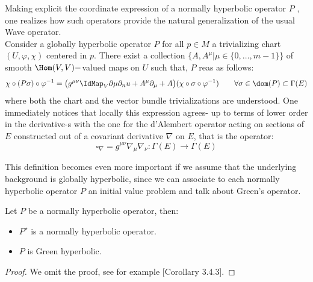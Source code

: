 \documentclass[Main]{subfiles}
\begin{document}
		\begin{observation}%
			Making explicit the coordinate expression of a normally hyperbolic operator $P$ , one realizes how such operators  provide the natural generalization of the usual Wave operator. 
			\\
			Consider a globally hyperbolic operator $P$ for all $p \in M$ a trivializing chart $(U, \varphi, \chi)$ centered in $p$. 
			There exist a collection $\big\{A, A^\mu \vert \mu\in \{0, \ldots ,m-1\}\big\}$ of smooth 
			$\Hom(V,V)-$valued maps on $U$ such that, $P$ reas as follows:
			\begin{equation}\label{Eq:NormallyHyperbolicRepresentation}
				\chi \circ ( P \sigma) \circ \varphi^{-1} =
				\big( g^{\mu \nu} \IdMap_V \partial\mu \partial_nu + A^\mu \partial_\mu + A\big)
				(\chi \circ \sigma \circ \varphi^{-1} ) 
				\qquad \forall \sigma \in \dom(P) \subset \Gamma(E)
			\end{equation}
		where both the chart and the vector bundle trivializations are understood. 
		One immediately notices that locally this expression agrees- up to terms of lower order in the derivative-s with the one for the d'Alembert operator acting on sections of $E$  constructed out of a covariant derivative $\nabla$ on $E$, that is the operator:
		\begin{displaymath}
			\square_\nabla = g^{\mu \nu} \nabla_\mu \nabla_\nu : \Gamma(E) \rightarrow \Gamma(E)
		\end{displaymath}
		\end{observation}
		This definition becomes even more important if we assume that the underlying background is globally hyperbolic, since we can associate to each normally hyperbolic operator $P$ an initial value problem and talk about Green's operator.
		\begin{proposition}
			Let $P$ be a normally hyperbolic operator, then:
			\begin{itemize}
				\item	$P^\star$ is a normally hyperbolic operator.
				\item $P$ is Green hyperbolic.
			\end{itemize}
		\end{proposition}	
		\begin{proof}
			We omit the proof, see for example \cite{barwav}[Corollary 3.4.3].
		\end{proof}
		
\end{document}
